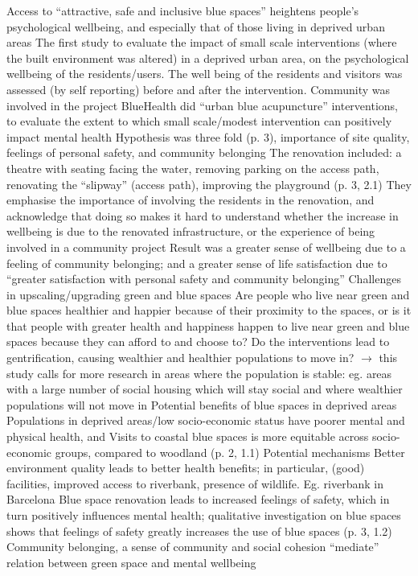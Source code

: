 \documentclass{article}
\begin{document}
\begin{outline}
	\1 Access to ``attractive, safe and inclusive blue spaces'' heightens people's psychological wellbeing, and especially that of those living in deprived urban areas
	\1 The first study to evaluate the impact of small scale interventions (where the built environment was altered) in a deprived urban area, on the psychological wellbeing of the residents/users. The well being of the residents and visitors was assessed (by self reporting) before and after the intervention. Community was involved in the project
		\2 BlueHealth did ``urban blue acupuncture'' interventions, to evaluate the extent to which small scale/modest intervention can positively impact mental health
		\2 Hypothesis was three fold (p. 3), importance of site quality, feelings of personal safety, and community belonging
		\2 The renovation included: a theatre with seating facing the water, removing parking on the access path, renovating the ``slipway'' (access path), improving the playground (p. 3, 2.1)
		\2 They emphasise the importance of involving the residents in the renovation, and acknowledge that doing so makes it hard to understand whether the increase in wellbeing is due to the renovated infrastructure, or the experience of being involved in a community project
	\1 Result was a greater sense of wellbeing due to a feeling of community belonging; and a greater sense of life satisfaction due to ``greater satisfaction with personal safety and community belonging''
	\1 Challenges in upscaling/upgrading green and blue spaces
		\2 Are people who live near green and blue spaces healthier and happier because of their proximity to the spaces, or is it that people with greater health and happiness happen to live near green and blue spaces because they can afford to and choose to?
		\2 Do the interventions lead to gentrification, causing wealthier and healthier populations to move in?
		\2 $\rightarrow$ this study calls for more research in areas where the population is stable: eg. areas with a large number of social housing which will stay social and where wealthier populations will not move in
	\1 Potential benefits of blue spaces in deprived areas
		\2 Populations in deprived areas/low socio-economic status have poorer mental and physical health, and 
		\2 Visits to coastal blue spaces is more equitable across socio-economic groups, compared to woodland (p. 2, 1.1)
	\1 Potential mechanisms
		\2 Better environment quality leads to better health benefits; in particular, (good) facilities, improved access to riverbank, presence of wildlife. Eg. riverbank in Barcelona
		\2 Blue space renovation leads to increased feelings of safety, which in turn positively influences mental health; qualitative investigation on blue spaces shows that feelings of safety greatly increases the use of blue spaces (p. 3, 1.2) 
		\2 Community belonging, a sense of community and social cohesion ``mediate'' relation between green space and mental wellbeing
\end{outline}
\end{document}
